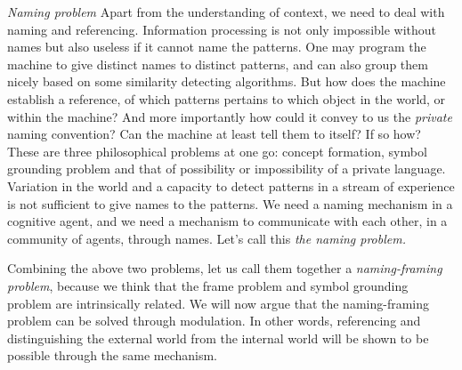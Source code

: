 \emph{Naming problem} Apart from the understanding of context, we need to deal with naming and referencing. Information processing is not only impossible without names but also useless if it cannot name the patterns. One may program the machine to give distinct names to distinct patterns, and can also group them nicely based on some similarity detecting algorithms. But how does the machine establish a reference, of which patterns pertains to which object in the world, or within the machine? And more importantly how could it convey to us the \textit{private} naming convention?  Can the machine at least tell them to itself?  If so how? These are three philosophical problems at one go: concept formation, symbol grounding problem and that of possibility or impossibility of a private language. Variation in the world and a capacity to detect patterns in a stream of experience is not sufficient to give names to the patterns. We need a naming mechanism in a cognitive agent, and we need a mechanism to communicate with each other, in a community of agents, through names. Let's call this \textit{the naming problem.} 

Combining the above two problems, let us call them together a \textit{naming-framing problem}, because we think that the frame problem and symbol grounding problem are intrinsically related. 
We will now argue that the naming-framing problem can be solved through modulation. In other words, referencing and distinguishing the external world from the internal world will be shown to be possible through the same mechanism. 

